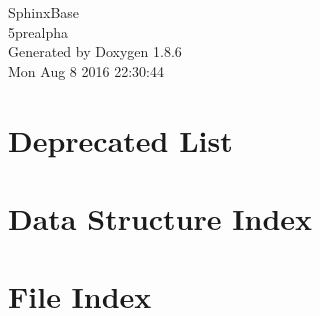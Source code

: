 \documentclass[twoside]{book}
\newcommand{\clearemptydoublepage}{%
  \newpage{\pagestyle{empty}\cleardoublepage}%
}
\begin{document}
\begin{titlepage}
\vspace*{7cm}
\begin{center}%
{\Large Sphinx\-Base \\[1ex]\large 5prealpha }\\
\vspace*{1cm}
{\large Generated by Doxygen 1.8.6}\\
\vspace*{0.5cm}
{\small Mon Aug 8 2016 22:30:44}\\
\end{center}
\end{titlepage}
\clearemptydoublepage
\tableofcontents
\clearemptydoublepage
{}

\chapter{Deprecated List}
\label{deprecated}

\chapter{Data Structure Index}

\chapter{File Index}

\end{document}
